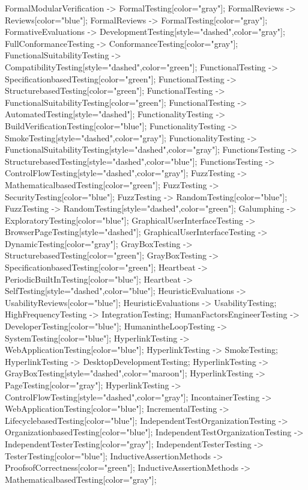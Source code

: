 \documentclass{article}
\begin{document}
{FormalModularVerification -> FormalTesting[color="gray"];
FormalReviews -> Reviews[color="blue"];
FormalReviews -> FormalTesting[color="gray"];
FormativeEvaluations -> DevelopmentTesting[style="dashed",color="gray"];
FullConformanceTesting -> ConformanceTesting[color="gray"];
FunctionalSuitabilityTesting -> CompatibilityTesting[style="dashed",color="green"];
FunctionalTesting -> SpecificationbasedTesting[color="green"];
FunctionalTesting -> StructurebasedTesting[color="green"];
FunctionalTesting -> FunctionalSuitabilityTesting[color="green"];
FunctionalTesting -> AutomatedTesting[style="dashed"];
FunctionalityTesting -> BuildVerificationTesting[color="blue"];
FunctionalityTesting -> SmokeTesting[style="dashed",color="gray"];
FunctionalityTesting -> FunctionalSuitabilityTesting[style="dashed",color="gray"];
FunctionsTesting -> StructurebasedTesting[style="dashed",color="blue"];
FunctionsTesting -> ControlFlowTesting[style="dashed",color="gray"];
FuzzTesting -> MathematicalbasedTesting[color="green"];
FuzzTesting -> SecurityTesting[color="blue"];
FuzzTesting -> RandomTesting[color="blue"];
FuzzTesting -> RandomTesting[style="dashed",color="green"];
Galumphing -> ExploratoryTesting[color="blue"];
GraphicalUserInterfaceTesting -> BrowserPageTesting[style="dashed"];
GraphicalUserInterfaceTesting -> DynamicTesting[color="gray"];
GrayBoxTesting -> StructurebasedTesting[color="green"];
GrayBoxTesting -> SpecificationbasedTesting[color="green"];
Heartbeat -> PeriodicBuiltInTesting[color="blue"];
Heartbeat -> SelfTesting[style="dashed",color="blue"];
HeuristicEvaluations -> UsabilityReviews[color="blue"];
HeuristicEvaluations -> UsabilityTesting;
HighFrequencyTesting -> IntegrationTesting;
HumanFactorsEngineerTesting -> DeveloperTesting[color="blue"];
HumanintheLoopTesting -> SystemTesting[color="blue"];
HyperlinkTesting -> WebApplicationTesting[color="blue"];
HyperlinkTesting -> SmokeTesting;
HyperlinkTesting -> DesktopDevelopmentTesting;
HyperlinkTesting -> GrayBoxTesting[style="dashed",color="maroon"];
HyperlinkTesting -> PageTesting[color="gray"];
HyperlinkTesting -> ControlFlowTesting[style="dashed",color="gray"];
IncontainerTesting -> WebApplicationTesting[color="blue"];
IncrementalTesting -> LifecyclebasedTesting[color="blue"];
IndependentTestOrganizationTesting -> OrganizationbasedTesting[color="blue"];
IndependentTestOrganizationTesting -> IndependentTesterTesting[color="gray"];
IndependentTesterTesting -> TesterTesting[color="blue"];
InductiveAssertionMethods -> ProofsofCorrectness[color="green"];
InductiveAssertionMethods -> MathematicalbasedTesting[color="gray"];
}
\end{document}
